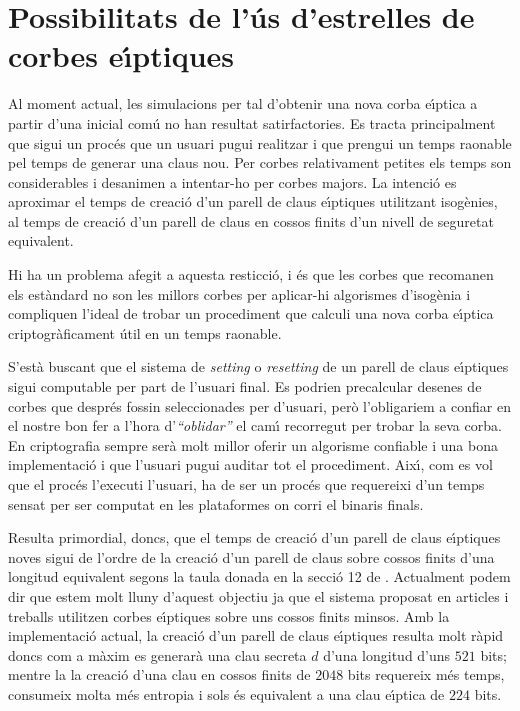 \documentclass[12pt,twoside,catalan,a4paper]{book}%
\numberwithin{figure}{section}		%
\theoremstyle{definition}   			%
\def\ce{corba e\lgem{}\'{\i}ptica}%
\def\ces{corbes e\lgem{}\'{\i}ptiques}%
\def\cfs{cossos finits}%
\theoremstyle{saltolinea}   			%
\begin{document}
\section{Possibilitats de l'\'us d'estrelles de \ces}

Al moment actual, les simulacions per tal d'obtenir una nova \ce{} a partir d'una inicial com\'u no han resultat satirfactories. Es tracta principalment que sigui un proc\'es que un usuari pugui realitzar i que prengui un temps raonable pel temps de generar una claus nou. Per corbes relativament petites els temps son considerables i desanimen a intentar-ho per corbes majors. La intenci\'o es aproximar el temps de creaci\'o d'un parell de claus e\lgem{}\'{\i}ptiques utilitzant isog\`enies, al temps de creaci\'o d'un parell de claus en \cfs{} d'un nivell de seguretat equivalent.

Hi ha un problema afegit a aquesta resticci\'o, i \'es que les corbes que recomanen els est\`andard no son les millors corbes per aplicar-hi algorismes d'isog\`enia i compliquen l'ideal de trobar un procediment que calculi una nova \ce{} criptogr\`aficament \'util en un temps raonable.

S'est\`a buscant que el sistema de \emph{setting} o \emph{resetting} de un parell de claus e\lgem{}\'{\i}ptiques sigui computable per part de l'usuari final. Es podrien precalcular desenes de corbes que despr\'es fossin seleccionades per d'usuari, per\`o l'obligariem a confiar en el nostre bon fer a l'hora d'\emph{``oblidar''} el cam\'{\i} recorregut per trobar la seva corba. En criptografia sempre ser\`a molt millor oferir un algorisme confiable i una bona implementaci\'o i que l'usuari pugui auditar tot el procediment. Aix\'{\i}, com es vol que el proc\'es l'executi l'usuari, ha de ser un proc\'es que requereixi d'un temps sensat per ser computat en les plataformes on corri el binaris finals.

Resulta primordial, doncs, que el temps de creaci\'o d'un parell de claus e\lgem{}\'{\i}ptiques noves sigui de l'ordre de la creaci\'o d'un parell de claus sobre \cfs{} d'una longitud equivalent segons la taula donada en la secci\'o 12 de \cite{ECPGP}. Actualment podem dir que estem molt lluny d'aquest objectiu ja que el sistema proposat en articles i treballs utilitzen \ces{} sobre uns \cfs{} minsos. Amb la implementaci\'o actual, la creaci\'o d'un parell de claus e\lgem{}\'{\i}ptiques resulta molt r\`apid doncs com a m\`axim es generar\`a una clau secreta $d$ d'una longitud d'uns $521$ bits; mentre la la creaci\'o d'una clau en \cfs{} de $2048$ bits requereix m\'es temps, consumeix molta m\'es entropia i sols \'es equivalent a una clau e\lgem{}\'{\i}ptica de $224$ bits.
\end{document}
